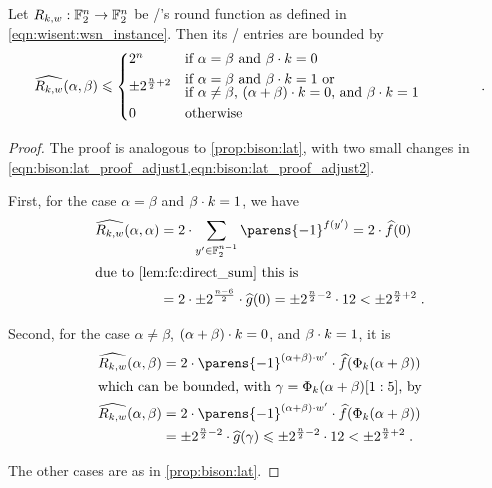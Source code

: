 \begin{proposition}
    Let $R_{k,w} : \mathbb{F}_2^n \to \mathbb{F}_2^n$ be \wisent/'s round function as defined in \cref{eqn:wisent:wsn_instance}.
    Then its \LAT/ entries are bounded by
    \begin{equation*}%
        \FC{R_{k,w}}(\alpha, \beta) \leqslant \begin{cases*}
            2^n                   & if $\alpha = \beta$ and $\iprod{\beta}{k} = 0$ \\
            \pm 2^{\frac{n}{2}+2} & \parbox[c]{0.6\textwidth}{%
                                        if $\alpha = \beta$ and $\iprod{\beta}{k} = 1$ or\\[-2.5pt]
                                        if $\alpha \neq \beta$, $\iprod{(\alpha + \beta)}{k} = 0$, and $\iprod{\beta}{k} = 1$
                                    }\\
            0                     & otherwise
        \end{cases*}\;.
    \end{equation*}
\end{proposition}
\begin{proof}
    The proof is analogous to \cref{prop:bison:lat}, with two small changes in \cref{eqn:bison:lat_proof_adjust1,eqn:bison:lat_proof_adjust2}.

    First, for the case $\alpha = \beta$ and $\beta \cdot k = 1$, we have
    \begin{align*}
        \FC{R_{k,w}}(\alpha, \alpha)
        &= 2 \cdot \sum_{y^\prime \in \F_2^{n-1}}\parens{-1}^{f(y^\prime)} = 2 \cdot \FC{f}(0) \\
        \intertext{due to \cref{lem:fc:direct_sum} this is}
        &= 2 \cdot \pm 2^{\frac{n-6}{2}} \cdot \FC{g}(0) = \pm 2^{\frac{n}{2}-2} \cdot 12 < \pm 2^{\frac{n}{2}+2}\;.
    \end{align*}

    Second, for the case $\alpha \neq \beta$, $(\alpha + \beta) \cdot k = 0$, and $\beta \cdot k = 1$, it is
    \begin{align*}
        \FC{R_{k,w}}(\alpha, \beta)
        &= 2 \cdot \parens{-1}^{\iprod{(\alpha + \beta)}{w^\prime}} \cdot \FC{f}(\Phi_k(\alpha + \beta)) \\
        \intertext{which can be bounded, with $\gamma = \Phi_k(\alpha + \beta)[1 : 5]$, by}
        \FC{R_{k,w}}(\alpha, \beta)
        &= 2 \cdot \parens{-1}^{\iprod{(\alpha + \beta)}{w^\prime}} \cdot \FC{f}(\Phi_k(\alpha + \beta)) \\
        &= \pm 2^{\frac{n}{2} - 2} \cdot \FC{g}(\gamma) \leqslant \pm 2^{\frac{n}{2} - 2} \cdot 12 < \pm 2^{\frac{n}{2}+2}\;.
    \end{align*}

    The other cases are as in \cref{prop:bison:lat}.
\end{proof}

